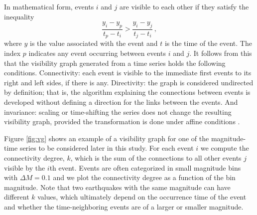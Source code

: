 In mathematical form, events $i$ and $j$ are visible to each other if they satisfy the inequality
%
\begin{equation}
	\frac{y_i - y_p }{t_p - t_i} > \frac{y_i - y_j}{ t_j - t_i} \, ,
\end{equation}
%
\noindent
where $y$ is the value associated with the event and $t$ is the time of the event. The index $p$ indicates any event occurring between events $i$  and $j$. It follows from this that the visibility graph generated from a time series holds the following conditions. Connectivity: each event is visible to the immediate first events to its right and left sides, if there is any. Directivity: the graph is considered undirected by definition; that is, the algorithm explaining the connections between events is developed without defining a direction for the links between the events. And invariance: scaling or time-shifting the series does not change the resulting visibility graph, provided the transformation is done under affine conditions \citep{Lacasa2008}.

Figure \ref{fig:vg} shows an example of a visibility graph for one of the magnitude-time series to be considered later in this study. For each event $i$ we compute the connectivity degree, $k$, which is the sum of the connections to all other events $j$ visible by the $i$th event. Events are often categorized in small magnitude bins with $\Delta M = 0.1$ and we plot the connectivity degree as a function of the bin magnitude. Note that two earthquakes with the same magnitude can have different $k$ values, which ultimately depend on the occurrence time of the event and whether the time-neighboring events are of a larger or smaller magnitude.

